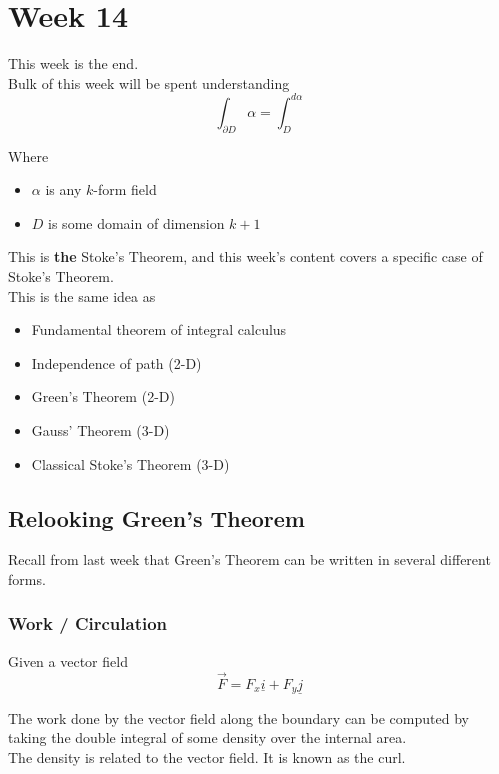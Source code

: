 \chapter{Week 14}

This week is the end. \\

Bulk of this week will be spent understanding
\[
  \int_{\partial D}^{} \alpha = \int_{D}^{d\alpha}   
\] 

Where 
\begin{itemize}
   \item $\alpha$ is any $k$-form field
   \item $D$ is some domain of dimension $k + 1$
\end{itemize}

This is \textbf{the} Stoke's Theorem, and this week's content covers a specific case of Stoke's Theorem. \\

This is the same idea as 
\begin{itemize}
   \item Fundamental theorem of integral calculus
   \item Independence of path (2-D)
   \item Green's Theorem (2-D)
   \item Gauss' Theorem (3-D)
   \item Classical Stoke's Theorem (3-D)
\end{itemize}

\section{Relooking Green's Theorem}

Recall from last week that Green's Theorem can be written in several different forms. 

\subsection{Work / Circulation}

Given a vector field \[
  \vec{F} = F_x \underline{i} + F_y \underline{j}
\] 

The work done by the vector field along the boundary can be computed by taking the double integral of some density over the internal area. \\

The density is related to the vector field. It is known as the curl. \\

